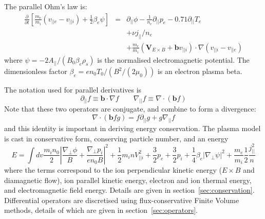 \documentclass[12pt,a4paper]{article}
\begin{document}
The parallel Ohm's law is:
\begin{subequations}
  \begin{eqnarray}
    \frac{\partial}{\partial t}\left[\frac{m_e}{m_i}\left(v_{||e}-v_{||i}\right) + \frac{1}{2}\beta_e\psi\right] &=&  \partial_{||}\phi - \frac{1}{n_e}\partial_{||} p_e - 0.71\partial_{||} T_e \\
    && + \nu j_{||}/n_e \\
    &&+ \frac{m_e}{m_i}\left(\mathbf{V}_{E\times B} + \mathbf{b}v_{||i}\right)\cdot\nabla\left(v_{||i} - v_{||e}\right) \label{eq:hotion_ohm}
  \end{eqnarray}
\end{subequations}
where $\psi = -2A_{||} / \left(B_0\beta_e\rho_s\right)$ is the normalised electromagnetic
potential. The dimensionless factor $\beta_e = en_0T_0/\left(B^2 / \left(2\mu_0\right)\right)$ is an electron plasma beta.

The notation used for parallel derivatives is
\begin{equation}
  \partial_{||} f \equiv \mathbf{b}\cdot\nabla f \qquad \nabla_{||} f \equiv \nabla\cdot\left(\mathbf{b} f\right)
\end{equation}
Note that these two operators are conjugate, and combine to form a divergence:
\[
\nabla\cdot\left(\mathbf{b}fg\right) = f\partial_{||} g + g \nabla_{||} f
\]
and this identity is important in deriving energy conservation.
The plasma model is cast in conservative form, conserving particle number, and an energy
\begin{equation}
E = \int dv \frac{m_in_0}{2}\left|\frac{\nabla_\perp\phi}{B} + \frac{\nabla_\perp p_i}{en_0B}\right|^2 + \frac{1}{2}m_inV_{||i}^2 + \frac{3}{2}p_e + \frac{3}{2}p_i + \frac{1}{4}\beta_e\left|\nabla_\perp\psi\right|^2 + \frac{m_e}{m_i}\frac{1}{2}\frac{j_{||}^2}{n}
\label{eq:conserved-energy}
\end{equation}
where the terms correspond to the ion perpendicular kinetic energy ($E\times B$ and diamagnetic flow), ion parallel kinetic energy, electron and ion thermal energy, and electromagnetic field energy. Details are given in section~\ref{sec:conservation}. Differential operators are discretised using flux-conservative Finite Volume methods, details of which are given in section~\ref{sec:operators}. 
\end{document}
